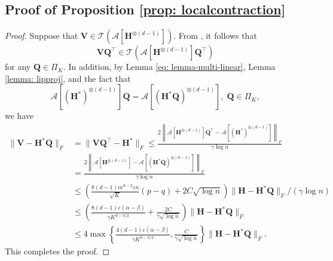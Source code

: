 \documentclass{article}
\theoremstyle{plain}
\theoremstyle{definition}
\theoremstyle{remark}
\newcommand{\BH}{\bm{H}}
\newcommand{\BQ}{\bm{Q}}
\newcommand{\TCal}{\mathcal{T}}
\newcommand{\ACal}{\mathcal{A}}
\begin{document}
\begin{appendix}
\begin{center}
	\section{Proof of Proposition \ref{prop: localcontraction}}	
		\begin{proof}
			Suppose that $\bm{V}\in \TCal \left(\ACal[\BH^{\otimes(d-1)}]\right)$. From \citet[Lemma 9]{wang2021optimal}, it follows that
			\begin{equation*}
				\bm{VQ}^\top \in \TCal\left(\ACal[\BH^{\otimes(d-1)}]\BQ^\top\right)
			\end{equation*}
			for any $\BQ \in \Pi_K$. In addition, by Lemma \ref{eq: lemma-multi-linear}, Lemma \ref{lemma: lipproj}, and the fact that
			\begin{equation*}
				\ACal[(\BH^*)^{\otimes(d-1)}] \BQ = \ACal[(\BH^*\BQ)^{\otimes(d-1)}], \; \BQ \in \Pi_K,
			\end{equation*}
			we have
			\begin{align*}
				\| \bm{V} - \BH^* \BQ\|_F & = \| \bm{VQ}^\top - \BH^*\|_F
				\leq \frac{2 \left\| \ACal[\BH^{\otimes(d-1)}] \BQ^\top - \ACal[(\BH^*)^{\otimes(d-1)}] \right\|_F }{\gamma \log n}\\
				& = \frac{2 \left\| \ACal[\BH^{\otimes(d-1)}] - \ACal[(\BH^*\BQ)^{\otimes(d-1)}]  \right\|_F }{\gamma \log n} \\
				& \leq \left(\frac{8(d-1)m^{d-2}\varepsilon n}{\sqrt{K}} (p-q) + 2C\sqrt{\log n} \right) \|\BH - \BH^* \BQ\|_F/(\gamma \log n) \\
				& \leq  \left( \frac{8(d-1)\varepsilon (\alpha - \beta)}{\gamma K^{d-3/2}}  +\frac{2C}{\gamma \sqrt{\log n}}\right) \| \BH - \BH^* \BQ\|_F \\
				& \leq  4 \max \left\{\frac{4(d-1)\varepsilon (\alpha - \beta)}{\gamma K^{d-3/2}},  \frac{C}{\gamma \sqrt{\log n}} \right\} \|\BH - \BH^* \BQ\|_F.
			\end{align*}
			This completes the proof.
		\end{proof}

\end{center}
\end{appendix}
\end{document}
